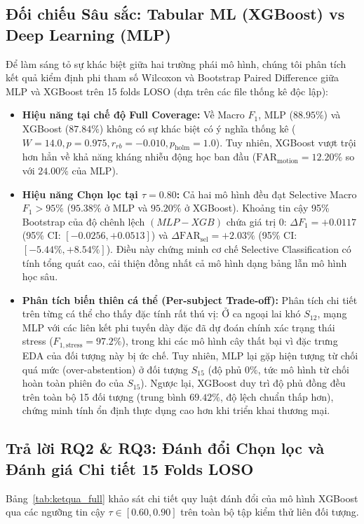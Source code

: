 \documentclass[conference]{IEEEtran}
\begin{document}
\subsection{Đối chiếu Sâu sắc: Tabular ML (XGBoost) vs Deep Learning (MLP)}
Để làm sáng tỏ sự khác biệt giữa hai trường phái mô hình, chúng tôi phân tích kết quả kiểm định phi tham số Wilcoxon và Bootstrap Paired Difference giữa MLP và XGBoost trên 15 folds LOSO (dựa trên các file thống kê độc lập):
\begin{itemize}
    \item \textbf{Hiệu năng tại chế độ Full Coverage:} Về Macro $F_1$, MLP ($88.95\%$) và XGBoost ($87.84\%$) không có sự khác biệt có ý nghĩa thống kê ($W = 14.0, p = 0.975, r_{rb} = -0.010, p_{\text{holm}} = 1.0$). Tuy nhiên, XGBoost vượt trội hơn hẳn về khả năng kháng nhiễu động học ban đầu ($\text{FAR}_{\text{motion}} = 12.20\%$ so với $24.00\%$ của MLP).
    \item \textbf{Hiệu năng Chọn lọc tại $\tau = 0.80$:} Cả hai mô hình đều đạt Selective Macro $F_1 > 95\%$ ($95.38\%$ ở MLP và $95.20\%$ ở XGBoost). Khoảng tin cậy 95\% Bootstrap của độ chênh lệch $(MLP - XGB)$ chứa giá trị 0: $\Delta F_1 = +0.0117$ (95\% CI: $[-0.0256, +0.0513]$) và $\Delta \text{FAR}_{\text{sel}} = +2.03\%$ (95\% CI: $[-5.44\%, +8.54\%]$). Điều này chứng minh cơ chế Selective Classification có tính tổng quát cao, cải thiện đồng nhất cả mô hình dạng bảng lẫn mô hình học sâu.
    \item \textbf{Phân tích biến thiên cá thể (Per-subject Trade-off):} Phân tích chi tiết trên từng cá thể cho thấy đặc tính rất thú vị: Ở ca ngoại lai khó $S_{12}$, mạng MLP với các liên kết phi tuyến dày đặc đã dự đoán chính xác trạng thái stress ($F_{1,\text{stress}} = 97.2\%$), trong khi các mô hình cây thất bại vì đặc trưng EDA của đối tượng này bị ức chế. Tuy nhiên, MLP lại gặp hiện tượng từ chối quá mức (over-abstention) ở đối tượng $S_{15}$ (độ phủ $0\%$, tức mô hình từ chối hoàn toàn phiên đo của $S_{15}$). Ngược lại, XGBoost duy trì độ phủ đồng đều trên toàn bộ 15 đối tượng (trung bình $69.42\%$, độ lệch chuẩn thấp hơn), chứng minh tính ổn định thực dụng cao hơn khi triển khai thương mại.
\end{itemize}

\subsection{Trả lời RQ2 \& RQ3: Đánh đổi Chọn lọc và Đánh giá Chi tiết 15 Folds LOSO}

Bảng~\ref{tab:ketqua_full} khảo sát chi tiết quy luật đánh đổi của mô hình XGBoost qua các ngưỡng tin cậy $\tau \in [0.60, 0.90]$ trên toàn bộ tập kiểm thử liên đối tượng.
\end{document}

